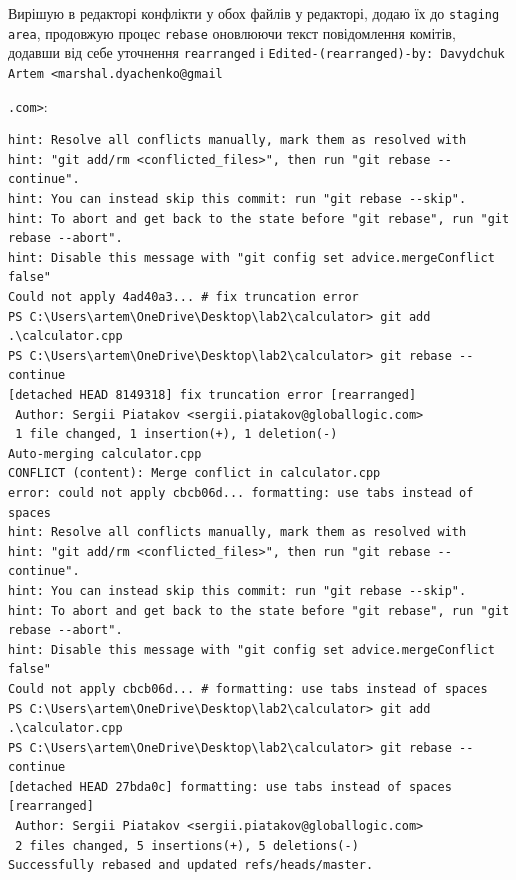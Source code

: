 \documentclass[12pt,a4paper]{article}
\begin{document}
    Вирішую в редакторі конфлікти у обох файлів у редакторі, додаю їх до \texttt{staging area}, продовжую процес \texttt{rebase} оновлюючи текст повідомлення
    комітів, додавши від себе уточнення \texttt{rearranged} і \texttt{Edited-(rearranged)-by: Davydchuk Artem <marshal.dyachenko@gmail}

    \texttt{.com>}:
    \begin{verbatim}
hint: Resolve all conflicts manually, mark them as resolved with
hint: "git add/rm <conflicted_files>", then run "git rebase --continue".
hint: You can instead skip this commit: run "git rebase --skip".
hint: To abort and get back to the state before "git rebase", run "git rebase --abort".
hint: Disable this message with "git config set advice.mergeConflict false"
Could not apply 4ad40a3... # fix truncation error
PS C:\Users\artem\OneDrive\Desktop\lab2\calculator> git add .\calculator.cpp
PS C:\Users\artem\OneDrive\Desktop\lab2\calculator> git rebase --continue 
[detached HEAD 8149318] fix truncation error [rearranged]
 Author: Sergii Piatakov <sergii.piatakov@globallogic.com>
 1 file changed, 1 insertion(+), 1 deletion(-)
Auto-merging calculator.cpp
CONFLICT (content): Merge conflict in calculator.cpp
error: could not apply cbcb06d... formatting: use tabs instead of spaces
hint: Resolve all conflicts manually, mark them as resolved with
hint: "git add/rm <conflicted_files>", then run "git rebase --continue".
hint: You can instead skip this commit: run "git rebase --skip".
hint: To abort and get back to the state before "git rebase", run "git rebase --abort".
hint: Disable this message with "git config set advice.mergeConflict false"
Could not apply cbcb06d... # formatting: use tabs instead of spaces
PS C:\Users\artem\OneDrive\Desktop\lab2\calculator> git add .\calculator.cpp
PS C:\Users\artem\OneDrive\Desktop\lab2\calculator> git rebase --continue 
[detached HEAD 27bda0c] formatting: use tabs instead of spaces [rearranged]
 Author: Sergii Piatakov <sergii.piatakov@globallogic.com>
 2 files changed, 5 insertions(+), 5 deletions(-)
Successfully rebased and updated refs/heads/master.
    \end{verbatim}
\end{document}
